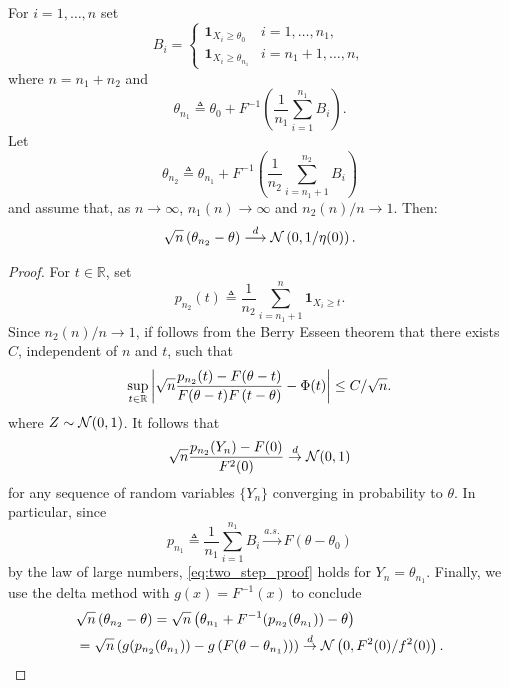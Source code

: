 \begin{thm}
For $i=1,\ldots,n$ set
\begin{equation*}
B_i = \begin{cases}
 \mathbf 1_{X_i \geq \theta_0} & i = 1,\ldots,n_1, \\
 \mathbf 1_{X_i \geq {\theta}_{n_1} }& i={n_1+1,\ldots,n},
\end{cases}
\end{equation*}
where $n = n_1+ n_2$ and 
\begin{equation*}
{\theta}_{n_1} \triangleq \theta_0 + F^{-1}\left(
\frac{1}{n_1} \sum_{i=1}^{n_1} B_i 
 \right).
\end{equation*} 
Let 
\begin{equation*}
{\theta}_{n_2}  \triangleq {\theta}_{n_1} +  F^{-1} \left( \frac{1}{n_2} \sum_{i=n_1+1}^{n_2} B_i \right)
\end{equation*}
and assume that, as $n\to \infty$, $n_1(n) \rightarrow \infty$ and $n_2(n)/n \rightarrow 1$. Then:
\begin{align*}
 \sqrt{n} \left( {\theta}_{n_2} - \theta  \right) \overset{d}{\longrightarrow}  \mathcal{N}\left( 0, 1/\eta(0) \right).
\end{align*}
\end{thm}
%
%
\begin{proof}
For $t\in \mathbb R$, set
\begin{equation*}
p_{n_2}(t) \triangleq \frac{1}{n_2} \sum_{i=n_1+1}^{n} \mathbf 1_{X_i \geq t}. 
\end{equation*}
Since $n_2(n)/n \to 1$, if follows from the Berry Esseen theorem that there exists $C$, independent of $n$ and $t$, such that 
\begin{align*}
\sup_{t \in \mathbb{R}} \left| \sqrt{n} \frac{ p_{n_2}(t) - F( \theta - t)} {F(\theta - t) F \left( t - \theta\right) }  - \Phi(t) \right|  \leq C/\sqrt{n}. 
\end{align*}
where $Z \sim \mathcal{N}(0,1)$. It follows that
\begin{align}
\label{eq:two_step_proof}
 \sqrt{n} \frac{ p_{n_2}(Y_n) - F(0)} {F^2(0) }  \overset{d}{\rightarrow} \mathcal{N}(0,1)
\end{align}
for any sequence of random variables $\{Y_n\}$ converging in probability to $\theta$. In particular, since
\begin{equation*}
p_{n_1} \triangleq \frac{1}{n_1} \sum_{i=1}^{n_1} B_i \overset{a.s.}{\rightarrow} F(\theta - \theta_0)
\end{equation*}
by the law of large numbers, \eqref{eq:two_step_proof} holds for $Y_n = \theta_{n_1}$. Finally, we use the delta method with $g(x) = F^{-1}(x)$ to conclude
\begin{align*}
& \sqrt{n}\left( \theta_{n_2} - \theta \right) = \sqrt{n} \left( \theta_{n_1} + F^{-1}(p_{n_2}(\theta_{n_1})) - \theta \right) \\
&= \sqrt{n} \left( g(p_{n_2}(\theta_{n_1})) - g \left(F(\theta-\theta_{n_1}) \right)  \right) \overset{d}{\to} \mathcal{N}\left(0, 
F^2(0)/ f^2(0) \right).
\end{align*}
\end{proof}
%

